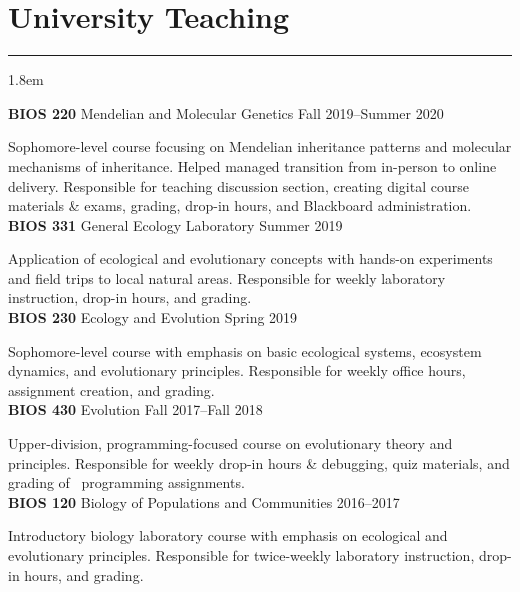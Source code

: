 \documentclass[]{article}
\begin{document}
\section{University Teaching}
\hrule
\vspace{4mm}
\leftskip 1.8em

\textbf{BIOS 220} Mendelian and Molecular Genetics \hfill Fall 2019--Summer 2020
     
Sophomore-level course focusing on Mendelian inheritance patterns and molecular mechanisms of \linebreak inheritance. Helped managed transition from in-person to online delivery. Responsible for teaching discussion section, creating digital course materials \& exams, grading, drop-in hours, and Blackboard \linebreak administration. \href{https://ledelaney.org/teaching/genetics220/}{\faLink} \href{https://github.com/ledelaney/Genetics220}{\faGithub}\\
     
\textbf{BIOS 331} General Ecology Laboratory \hfill Summer 2019

Application of ecological and evolutionary concepts with hands-on experiments and field trips to local natural areas. Responsible for weekly laboratory instruction, drop-in hours, and grading. \href{https://github.com/ledelaney/GeneralEcologyMaterials}{\faGithub}\\
     
\textbf{BIOS 230} Ecology and Evolution \hfill Spring 2019

Sophomore-level course with emphasis on basic ecological systems, ecosystem dynamics, and \linebreak evolutionary principles. Responsible for weekly office hours, assignment creation, and grading.\\
     
\textbf{BIOS 430} Evolution \hfill Fall 2017--Fall 2018
     
Upper-division, programming-focused course on evolutionary theory and principles. Responsible for weekly drop-in hours \& debugging, quiz materials, and grading of \textcolor{light-gray}{\faRProject}\ programming assignments.\\

\textbf{BIOS 120} Biology of Populations and Communities \hfill 2016--2017
     
Introductory biology laboratory course with emphasis on ecological and evolutionary principles. \linebreak Responsible for twice-weekly laboratory instruction, drop-in hours, and grading.
\end{document}
